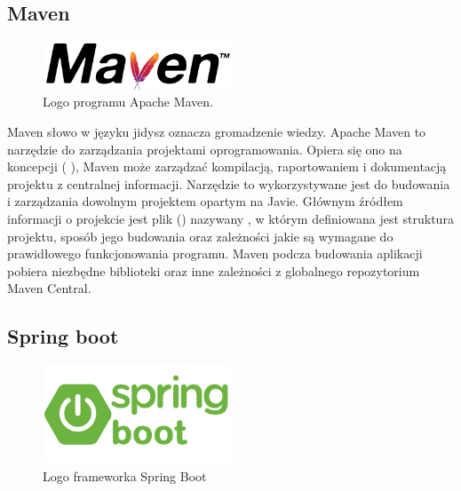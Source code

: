 \subsection{Maven}

\begin{figure}[htbp!]
    \centering
    \includegraphics[width=0.5\textwidth]{images/mavenLogo.png}
    \caption{Logo programu Apache Maven\cite{mavenSite}.}
    \label{fig:enter-label}
\end{figure}

Maven słowo w języku jidysz oznacza gromadzenie wiedzy. Apache Maven to narzędzie do zarządzania projektami oprogramowania. Opiera się ono na koncepcji  ( ), Maven może zarządzać kompilacją, raportowaniem i dokumentacją projektu z centralnej informacji. Narzędzie to wykorzystywane jest do budowania i zarządzania dowolnym projektem opartym na Javie. Głównym źródłem informacji o projekcie jest plik  () nazywany , w którym definiowana jest struktura projektu, sposób jego budowania oraz zależności jakie są wymagane do prawidłowego funkcjonowania programu. Maven podcza budowania aplikacji pobiera niezbędne biblioteki oraz inne zależności z globalnego repozytorium Maven Central\cite{mavenSite}.

\subsection{Spring boot}

\begin{figure}[!htbp]
    \centering
    \includegraphics[width=0.5\textwidth]{images/springboot/springBootLogo.png}
    \caption{Logo frameworka Spring Boot \cite{springLogo}}
    \label{fig:enter-label}
\end{figure}


